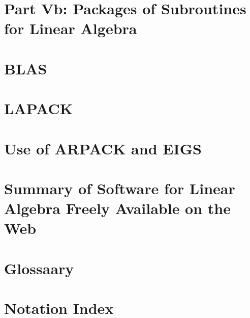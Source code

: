 \documentclass[a4paper]{article}
\begin{document}
\section*{Part Vb: Packages of Subroutines for Linear Algebra}

\section{BLAS}

\section{LAPACK}

\section{Use of ARPACK and EIGS}

\section{Summary of Software for Linear Algebra Freely Available on the Web}

\section{Glossaary}

\section{Notation Index}
\end{document}
